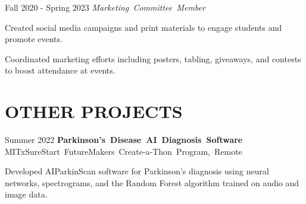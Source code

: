 \documentclass[10pt, letterpaper]{article}
\begin{document}
\vspace{\highlightSpacing}
\begin{twocolentry}{Fall 2020 - Spring 2023}
    \mbox{\textit{Marketing Committee Member}}
\end{twocolentry}
\vspace{\highlightSpacing}
\begin{onecolentry}
    \begin{highlights}
        \item Created social media campaigns and print materials to engage students and promote events.
        \item Coordinated marketing efforts including posters, tabling, giveaways, and contests to boost attendance at events.
    \end{highlights}
\end{onecolentry}

\section{OTHER PROJECTS}

\begin{twocolentry}{Summer 2022}
    \mbox{\textbf{Parkinson's Disease AI Diagnosis Software}}
    \kern {}
    \AND
    \kern {}
    \mbox{MITxSureStart FutureMakers Create-a-Thon Program, Remote}
\end{twocolentry}

\vspace{\highlightSpacing}
\begin{onecolentry}
    \begin{highlights}
        \item Developed AIParkinScan software for Parkinson's diagnosis using neural networks, spectrograms, and the Random Forest algorithm trained on audio and image data.
    \end{highlights}
\end{onecolentry}
\end{document}
